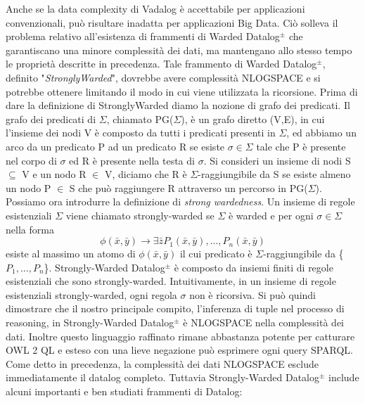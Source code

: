 Anche se la data complexity di Vadalog è accettabile per applicazioni convenzionali, può risultare inadatta per applicazioni Big Data. \newline
Ciò solleva il problema relativo all'esistenza di frammenti di Warded Datalog$^\pm$ che garantiscano una minore complessità dei dati, ma mantengano allo stesso tempo le proprietà descritte in precedenza. \newline
Tale frammento di Warded Datalog$^\pm$, definito "\emph{StronglyWarded}", dovrebbe avere complessità NLOGSPACE e si potrebbe ottenere limitando il modo in cui viene utilizzata la ricorsione. Prima di dare la definizione di StronglyWarded diamo la nozione di grafo dei predicati. \newline
Il grafo dei predicati di $\Sigma$, chiamato PG($\Sigma$), è un grafo diretto (V,E), in cui l'insieme dei nodi V è composto da tutti i predicati presenti in $\Sigma$, ed abbiamo un arco da un predicato P ad un predicato R se esiste $\sigma \in \Sigma$ tale che P è presente nel corpo di $\sigma$ ed R è presente nella testa di $\sigma$. Si consideri un insieme di nodi S $\subseteq$ V e un nodo R $\in$ V, diciamo che R è $\Sigma$-raggiungibile da S se esiste almeno un nodo P $\in$ S che può raggiungere R attraverso un percorso in PG($\Sigma$). \newline
Possiamo ora introdurre la definizione di \emph{strong wardedness}. Un insieme di regole esistenziali $\Sigma$ viene chiamato strongly-warded se $\Sigma$ è warded e per ogni $\sigma \in \Sigma$ nella forma \[\phi(\bar{x}, \bar{y}) \rightarrow \exists \bar{z} P_{1}(\bar{x}, \bar{y}), ..., P_{n}(\bar{x}, \bar{y})\] esiste al massimo un atomo di $\phi(\bar{x}, \bar{y})$ il cui predicato è $\Sigma$-raggiungibile da \{$P_{1}, ..., P_{n}$\}. \newline
Strongly-Warded Datalog$^\pm$ è composto da insiemi finiti di regole esistenziali che sono strongly-warded. Intuitivamente, in un insieme di regole esistenziali strongly-warded, ogni regola $\sigma$ non è ricorsiva. Si può quindi dimostrare che il nostro principale compito, l'inferenza di tuple nel processo di reasoning, in Strongly-Warded Datalog$^\pm$ è NLOGSPACE nella complessità dei dati. Inoltre questo linguaggio raffinato rimane abbastanza potente per catturare OWL 2 QL e esteso con una lieve negazione può esprimere ogni query SPARQL. \newline
Come detto in precedenza, la complessità dei dati NLOGSPACE esclude immediatamente il datalog completo. Tuttavia Strongly-Warded Datalog$^\pm$ include alcuni importanti e ben studiati frammenti di Datalog:
